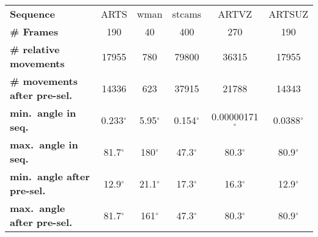 %
%
\begin{tabular}{l|ccc|cc}
\hline
\hline
                  \textbf{Sequence} &          ARTS &           wman &         stcams &         ARTVZ &        ARTSUZ \\ 
                 \textbf{\# Frames} &             190 &              40 &             400 &             270 &             190 \\ 
     \textbf{\# relative movements} &           17955 &             780 &           79800 &           36315 &           17955 \\ 
\textbf{\# movements after pre-sel.} &           14336 &             623 &           37915 &           21788 &           14343 \\ 
       \textbf{min.\ angle in seq.} &   0.233$^\circ$ &    5.95$^\circ$ &   0.154$^\circ$ & 0.00000171$^\circ$ &  0.0388$^\circ$ \\ 
       \textbf{max.\ angle in seq.} &    81.7$^\circ$ &     180$^\circ$ &    47.3$^\circ$ &    80.3$^\circ$ &    80.9$^\circ$ \\ 
\textbf{min.\ angle after pre-sel.} &    12.9$^\circ$ &    21.1$^\circ$ &    17.3$^\circ$ &    16.3$^\circ$ &    12.9$^\circ$ \\ 
\textbf{max.\ angle after pre-sel.} &    81.7$^\circ$ &     161$^\circ$ &    47.3$^\circ$ &    80.3$^\circ$ &    80.9$^\circ$ \\ \hline\hline
\end{tabular}
